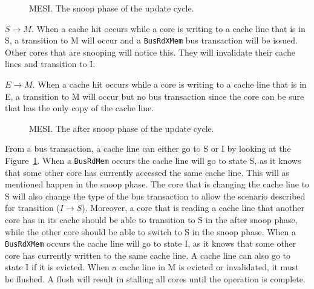 \begin{figure}[H]
    \centering
    \caption{MESI. The snoop phase of the update cycle.}
    \label{fig:mesi_snoop}
\end{figure}


$S \to M$.
When a cache hit occurs while a core is writing to a cache line that is in S, a transition to M will occur and a \texttt{BusRdXMem} bus transaction will be issued.
Other cores that are snooping will notice this.
They will invalidate their cache lines and transition to I.


$E \to M$.
When a cache hit occurs while a core is writing to a cache line that is in E, a
transition to M will occur but no bus transaction since the core can be sure that
has the only copy of the cache line.



\begin{figure}[H]
    \centering
    \caption{MESI. The after snoop phase of the update cycle.}
    \label{fig:mesi_after_snoop}
\end{figure}

From a bus transaction, a cache line can either go to S or I by looking at the Figure~\ref{fig:mesi_snoop}.
When a \texttt{BusRdMem} occurs the cache line will go to state S, as it knows that some other core has currently accessed the same cache line.
This will as mentioned happen in the snoop phase.
The core that is changing the cache line to S will also change the type of the bus transaction to allow the scenario described for transition ($I \to S$).
Moreover, a core that is reading a cache line that another core has in its cache should be able to transition to S in the after snoop phase, while the other core should be able to switch to S in the snoop phase.
When a \texttt{BusRdXMem} occurs the cache line will go to state I, as it knows that some other core has currently written to the same cache line.
A cache line can also go to state I if it is evicted.
When a cache line in M is evicted or invalidated, it must be flushed.
A flush will result in stalling all cores until the operation is complete.

